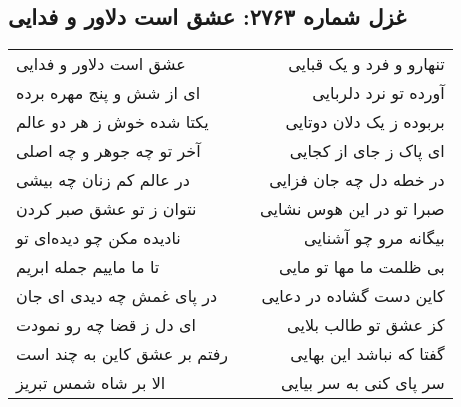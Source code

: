 \begin{center}
\section*{غزل شماره ۲۷۶۳: عشق است دلاور و فدایی}
\label{sec:2763}
\begin{longtable}{l p{0.5cm} r}
عشق است دلاور و فدایی
&&
تنهارو و فرد و یک قبایی
\\
ای از شش و پنج مهره برده
&&
آورده تو نرد دلربایی
\\
یکتا شده خوش ز هر دو عالم
&&
بربوده ز یک دلان دوتایی
\\
آخر تو چه جوهر و چه اصلی
&&
ای پاک ز جای از کجایی
\\
در عالم کم زنان چه بیشی
&&
در خطه دل چه جان فزایی
\\
نتوان ز تو عشق صبر کردن
&&
صبرا تو در این هوس نشایی
\\
نادیده مکن چو دیده‌ای تو
&&
بیگانه مرو چو آشنایی
\\
تا ما ماییم جمله ابریم
&&
بی ظلمت ما مها تو مایی
\\
در پای غمش چه دیدی ای جان
&&
کاین دست گشاده در دعایی
\\
ای دل ز قضا چه رو نمودت
&&
کز عشق تو طالب بلایی
\\
رفتم بر عشق کاین به چند است
&&
گفتا که نباشد این بهایی
\\
الا بر شاه شمس تبریز
&&
سر پای کنی به سر بیایی
\\
\end{longtable}
\end{center}
